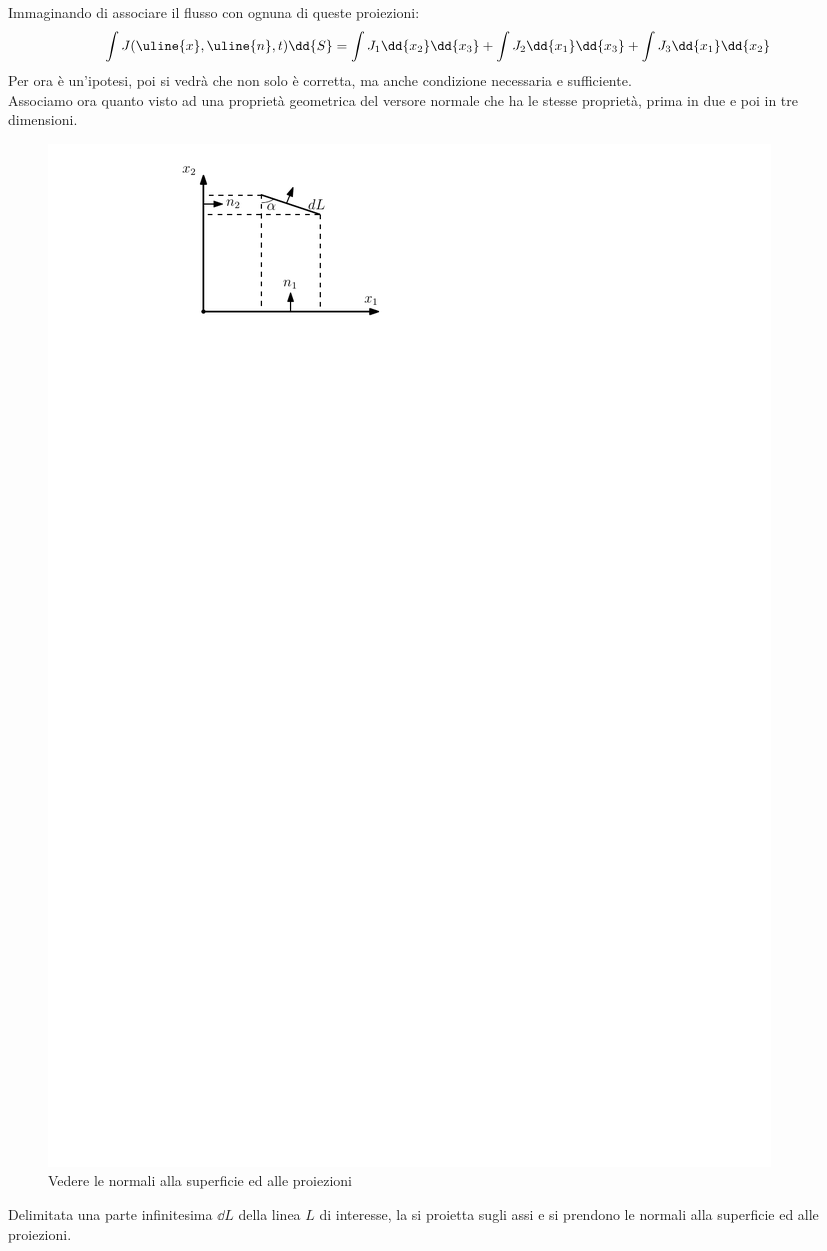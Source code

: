 %
Immaginando di associare il flusso con ognuna di queste proiezioni:
%
	\begin{equation*}
		\int J (\uline{x}, \uline{n}, t) \dd{S} = \int { J_1 \dd{x_2} \dd{x_3}} + \int {J_2 \dd{x_1} \dd{x_3}} + \int {J_3 \dd{x_1} \dd{x_2}}
	\end{equation*}
%
Per ora è un'ipotesi, poi si vedrà che non solo è corretta, ma anche condizione necessaria e sufficiente. \\
Associamo ora quanto visto ad una proprietà geometrica del versore normale che ha le stesse proprietà, prima in due e poi in tre dimensioni.
%
	\begin{figure}[ht]
		\includegraphics[scale=0.9]{./1.4 Equazioni di bilancio/1.4-4}
		\centering
		\caption{Vedere le normali alla superficie ed alle proiezioni}
	\end{figure}
%
Delimitata una parte infinitesima $\dd{L}$ della linea $L$ di interesse, la si proietta sugli assi e si prendono le normali alla superficie ed alle proiezioni.

